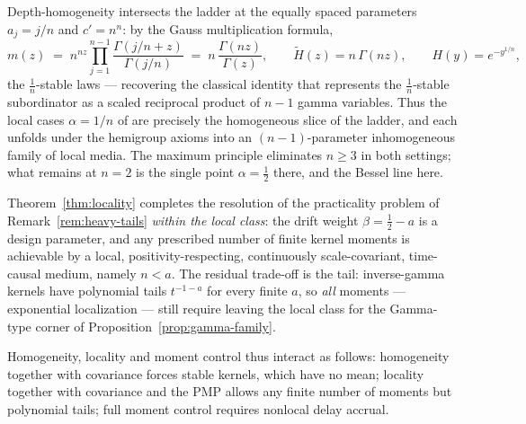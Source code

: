 \begin{remark}\label{rem:stable-slice}
Depth-homogeneity intersects the ladder at the equally spaced parameters $a_j = j/n$ and
$c' = n^n$: by the Gauss multiplication formula,
\[
  m(z) \;=\; n^{nz}\prod_{j=1}^{n-1}\frac{\Gamma(j/n + z)}{\Gamma(j/n)}
  \;=\; n\,\frac{\Gamma(nz)}{\Gamma(z)}, \qquad
  \tilde H(z) = n\,\Gamma(nz), \qquad H(y) = e^{-y^{1/n}},
\]
the $\tfrac1n$-stable laws --- recovering the classical identity that represents the
$\tfrac1n$-stable subordinator as a scaled reciprocal product of $n-1$ gamma variables. Thus
the local cases $\alpha = 1/n$ of  are precisely the
homogeneous slice of the ladder, and each unfolds under the hemigroup axioms into an
$(n-1)$-parameter inhomogeneous family of local media. The maximum principle eliminates
$n \ge 3$ in both settings; what remains at $n = 2$ is the single point $\alpha = \tfrac12$
there, and the Bessel line here.
\end{remark}

\begin{remark}\label{rem:trilemma}
Theorem~\ref{thm:locality} completes the resolution of the practicality problem of
Remark~\ref{rem:heavy-tails} \emph{within the local class}: the drift weight
$\beta = \tfrac12 - a$ is a design parameter, and any prescribed number of finite kernel
moments is achievable by a local, positivity-respecting, continuously scale-covariant,
time-causal medium, namely $n < a$. The residual trade-off is the tail: inverse-gamma kernels
have polynomial tails $t^{-1-a}$ for every finite $a$, so \emph{all} moments --- exponential
localization --- still require leaving the local class for the Gamma-type corner of
Proposition~\ref{prop:gamma-family}.

Homogeneity, locality and moment control thus interact as follows: homogeneity together with
covariance forces stable kernels, which have no mean; locality together with covariance and
the PMP allows any finite number of moments but polynomial tails; full moment control
requires nonlocal delay accrual.
\end{remark}
